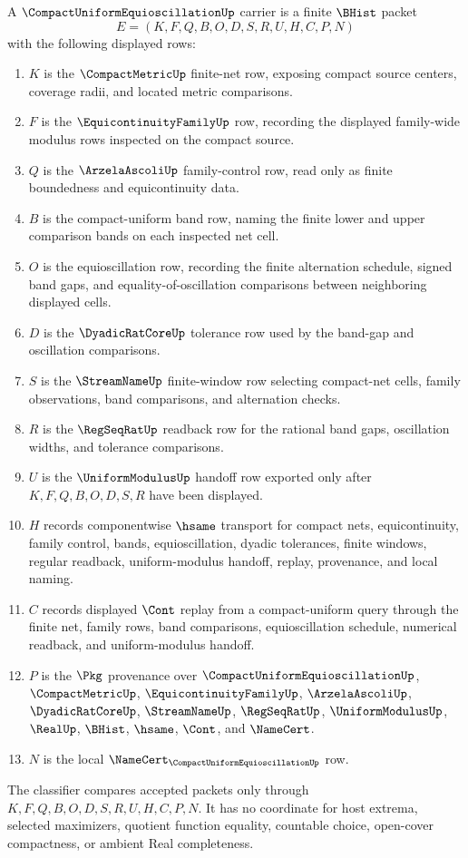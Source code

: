 \begin{definition}
\label{def:compact-uniform-equioscillation-carrier}
A $\CompactUniformEquioscillationUp$ carrier is a finite $\BHist$ packet
$$
E=(K,F,Q,B,O,D,S,R,U,H,C,P,N)
$$
with the following displayed rows:
\begin{enumerate}
\item $K$ is the $\CompactMetricUp$ finite-net row, exposing compact source centers, coverage radii, and located metric comparisons.
\item $F$ is the $\EquicontinuityFamilyUp$ row, recording the displayed family-wide modulus rows inspected on the compact source.
\item $Q$ is the $\ArzelaAscoliUp$ family-control row, read only as finite boundedness and equicontinuity data.
\item $B$ is the compact-uniform band row, naming the finite lower and upper comparison bands on each inspected net cell.
\item $O$ is the equioscillation row, recording the finite alternation schedule, signed band gaps, and equality-of-oscillation comparisons between neighboring displayed cells.
\item $D$ is the $\DyadicRatCoreUp$ tolerance row used by the band-gap and oscillation comparisons.
\item $S$ is the $\StreamNameUp$ finite-window row selecting compact-net cells, family observations, band comparisons, and alternation checks.
\item $R$ is the $\RegSeqRatUp$ readback row for the rational band gaps, oscillation widths, and tolerance comparisons.
\item $U$ is the $\UniformModulusUp$ handoff row exported only after $K,F,Q,B,O,D,S,R$ have been displayed.
\item $H$ records componentwise $\hsame$ transport for compact nets, equicontinuity, family control, bands, equioscillation, dyadic tolerances, finite windows, regular readback, uniform-modulus handoff, replay, provenance, and local naming.
\item $C$ records displayed $\Cont$ replay from a compact-uniform query through the finite net, family rows, band comparisons, equioscillation schedule, numerical readback, and uniform-modulus handoff.
\item $P$ is the $\Pkg$ provenance over $\CompactUniformEquioscillationUp$, $\CompactMetricUp$, $\EquicontinuityFamilyUp$, $\ArzelaAscoliUp$, $\DyadicRatCoreUp$, $\StreamNameUp$, $\RegSeqRatUp$, $\UniformModulusUp$, $\RealUp$, $\BHist$, $\hsame$, $\Cont$, and $\NameCert$.
\item $N$ is the local $\NameCert_{\CompactUniformEquioscillationUp}$ row.
\end{enumerate}
The classifier compares accepted packets only through $K,F,Q,B,O,D,S,R,U,H,C,P,N$. It has no coordinate for host extrema, selected maximizers, quotient function equality, countable choice, open-cover compactness, or ambient Real completeness.
\end{definition}

